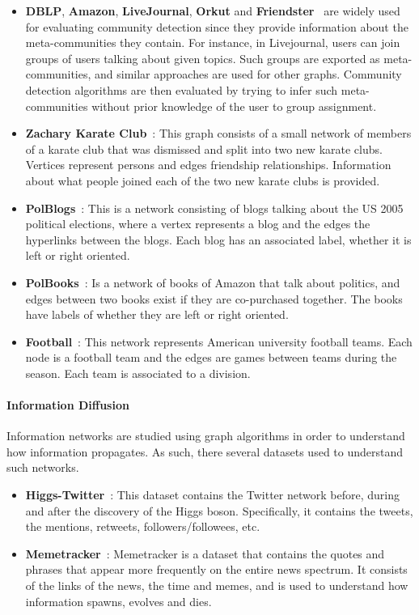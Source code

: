 \begin{itemize}
  \item \textbf{DBLP}, \textbf{Amazon}, \textbf{LiveJournal}, \textbf{Orkut} and \textbf{Friendster}~\cite{yang2015defining}
    are widely used for evaluating community detection since they provide
    information about the meta-communities they contain. For instance, in
    Livejournal, users can join groups of users talking about given topics. Such
    groups are exported as meta-communities, and similar approaches are used for
    other graphs. Community detection algorithms are then evaluated by trying to
    infer such meta-communities without prior knowledge of the user to group
    assignment.
  \item \textbf{Zachary Karate Club}~\cite{zachary1977information}: This graph consists
    of a small network of members of a karate club that was dismissed and split
    into two new karate clubs. Vertices represent persons and edges friendship
    relationships. Information about what people joined each of the two new
    karate clubs is provided.
  \item \textbf{PolBlogs}~\cite{adamic2005political}: This is a network consisting of
    blogs talking about the US 2005 political elections, where a vertex
    represents a blog and the edges the hyperlinks between the blogs. Each blog
    has an associated label, whether it is left or right oriented.
  \item \textbf{PolBooks}~\cite{10dimacs}: Is a network of books of Amazon that talk
    about politics, and edges between two books exist if they are co-purchased
    together. The books have labels of whether they are left or right oriented.
  \item \textbf{Football}~\cite{girvan2002network}: This network represents American university
    football teams. Each node is a football team and the edges are games between teams during the season. Each team is associated to a
    division.
\end{itemize}

\paragraph{Information Diffusion}

Information networks are studied using graph algorithms in order to understand
how information propagates. As such, there several datasets used to understand
such networks.

\begin{itemize}
  \item \textbf{Higgs-Twitter}~\cite{de2013anatomy}: This dataset contains the Twitter
    network before, during and after the discovery of the Higgs boson.
    Specifically, it contains the tweets, the mentions, retweets,
    followers/followees, etc.
  \item \textbf{Memetracker}~\cite{leskovec2009meme}: Memetracker is a dataset that
    contains the quotes and phrases that appear more frequently on the entire
    news spectrum. It consists of the links of the news, the time and memes, and
    is used to understand how information spawns, evolves and dies.
\end{itemize}

